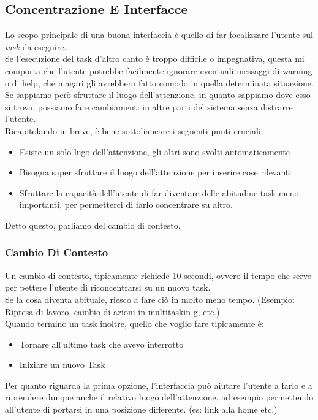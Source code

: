 \documentclass[oneside]{book}
\begin{document}
		\subsection{Concentrazione E Interfacce}
			Lo scopo principale di una buona interfaccia è quello di far focalizzare l'utente sul \emph{task} da eseguire.\\
			Se l'esecuzione del task d'altro canto è troppo difficile o impegnativa, questa mi comporta che l'utente potrebbe facilmente ignorare eventuali messaggi di warning o di help, che magari gli avrebbero fatto comodo in quella determinata situazione. \\
			Se sappiamo però sfruttare il luogo dell'attenzione, in quanto sappiamo dove esso si trova, possiamo fare cambiamenti in altre parti del sistema senza distrarre l'utente.\\
			Ricapitolando in breve, è bene sottolianeare i seguenti punti cruciali:
			\begin{itemize}
			\item Esiste un solo lugo dell'attenzione, gli altri sono svolti automaticamente
			\item Bisogna saper sfruttare il luogo dell'attenzione per inserire cose rilevanti
			\item Sfruttare la capacità dell'utente di far diventare delle abitudine task meno importanti, per permetterci di farlo concentrare su altro.
			\end{itemize}
			Detto questo, parliamo del cambio di contesto. 

			\subsubsection{Cambio Di Contesto}
				Un cambio di contesto, tipicamente richiede 10 secondi, ovvero il tempo che serve per pettere l'utente di riconcentrarsi su un nuovo task. \\
				Se la cosa diventa abituale, riesco a fare ciò in molto meno tempo. (Esempio: Ripresa di lavoro, cambio di azioni in multitaskin g, etc.)\\ 
				Quando termino un task inoltre, quello che voglio fare tipicamente è:
				\begin{itemize}
				\item Tornare all'ultimo task che avevo interrotto
				\item Iniziare un nuovo Task
				\end{itemize}
				Per quanto riguarda la prima opzione, l'interfaccia può aiutare l'utente a farlo e a riprendere dunque anche il relativo luogo dell'attenzione, ad esempio permettendo all'utente di portarsi in una posizione differente. (es: link alla home etc.)\\
\end{document}
